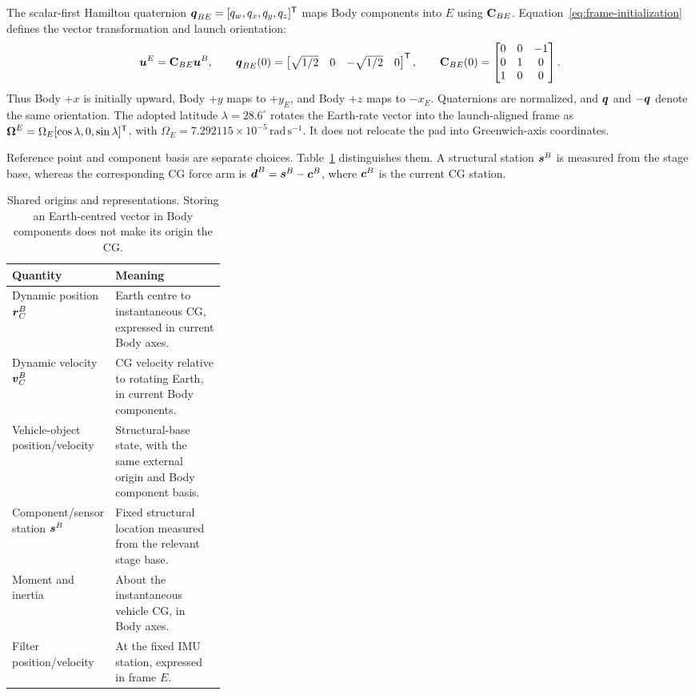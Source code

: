 The scalar-first Hamilton quaternion $\boldsymbol{q}_{BE}=[q_w,q_x,q_y,q_z]^{\mathsf T}$ maps Body components into $E$ using $\mathbf{C}_{BE}$. Equation~\eqref{eq:frame-initialization} defines the vector transformation and launch orientation:
\begin{equation}
 \boldsymbol{u}^E=\mathbf{C}_{BE}\boldsymbol{u}^B,\qquad
 \boldsymbol{q}_{BE}(0)=\begin{bmatrix}\sqrt{1/2}&0&-\sqrt{1/2}&0\end{bmatrix}^{\mathsf T},
 \qquad
 \mathbf{C}_{BE}(0)=\begin{bmatrix}0&0&-1\\0&1&0\\1&0&0\end{bmatrix}.
\label{eq:frame-initialization}
\end{equation}
Thus Body $+x$ is initially upward, Body $+y$ maps to $+y_E$, and Body $+z$ maps to $-x_E$. Quaternions are normalized, and $\boldsymbol{q}$ and $-\boldsymbol{q}$ denote the same orientation. The adopted latitude $\lambda=28.6^\circ$ rotates the Earth-rate vector into the launch-aligned frame as $\boldsymbol{\Omega}^E=\Omega_E[\cos\lambda,0,\sin\lambda]^{\mathsf T}$, with $\Omega_E=7.292115\times10^{-5}\,\mathrm{rad\,s^{-1}}$. It does not relocate the pad into Greenwich-axis coordinates.

Reference point and component basis are separate choices. Table~\ref{tab:state-origins} distinguishes them. A structural station $\boldsymbol{s}^B$ is measured from the stage base, whereas the corresponding CG force arm is $\boldsymbol{d}^B=\boldsymbol{s}^B-\boldsymbol{c}^B$, where $\boldsymbol{c}^B$ is the current CG station.

\begin{table}[!htbp]
\centering\small
\begin{tabularx}{\linewidth}{@{}p{0.31\linewidth}X@{}}
\toprule
Quantity & Meaning \\
\midrule
Dynamic position $\boldsymbol{r}_C^B$ & Earth centre to instantaneous CG, expressed in current Body axes. \\
Dynamic velocity $\boldsymbol{v}_C^B$ & CG velocity relative to rotating Earth, in current Body components. \\
Vehicle-object position/velocity & Structural-base state, with the same external origin and Body component basis. \\
Component/sensor station $\boldsymbol{s}^B$ & Fixed structural location measured from the relevant stage base. \\
Moment and inertia & About the instantaneous vehicle CG, in Body axes. \\
Filter position/velocity & At the fixed IMU station, expressed in frame $E$. \\
\bottomrule
\end{tabularx}
\caption{Shared origins and representations. Storing an Earth-centred vector in Body components does not make its origin the CG.}
\label{tab:state-origins}
\end{table}

